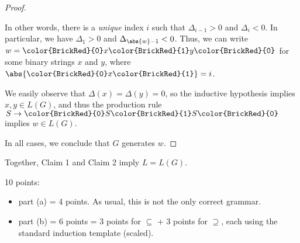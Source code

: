 \documentclass[11pt]{article}
\def\Sym#1{\texttt{\upshape \color{BrickRed} {#1}}}
\begin{document}
\begin{enumerate}
\begin{enumerate}
\begin{solution}
\begin{proof}
\begin{itemize}
\begin{itemize}
In other words, there is a \emph{unique} index $i$ such that $\Delta_{i-1}>0$ and $\Delta_i<0$.  In particular, we have $\Delta_1 > 0$ and $\Delta_{\abs{w}-1} < 0$.  Thus, we can write $w = \Sym0 x \Sym1 y\Sym0$ for some binary strings $x$ and $y$, where $\abs{\Sym0 x \Sym1} = i$.

We easily observe that $\Delta(x)=\Delta(y)=0$, so the inductive hypothesis implies $x, y\in L(G)$, and thus the production rule $S\to \Sym0 S \Sym1 S \Sym0$ implies  $w\in L(G)$.
\end{itemize}
\end{itemize}
In all cases, we conclude that $G$ generates $w$.
\end{proof}

\noindent
Together, Claim 1 and Claim 2 imply $L=L(G)$.\needqedtrue
\end{solution}

\begin{rubric}
10 points:
\begin{itemize}\cramped
\item part (a) = 4 points.  As usual, this is not the only correct grammar.
\item part (b) = 6 points = 3 points for $\subseteq$ + 3 points for $\supseteq$, each  using the standard induction template (scaled).
\end{itemize}
\end{rubric}
\end{enumerate}

\end{enumerate}
\end{document}
